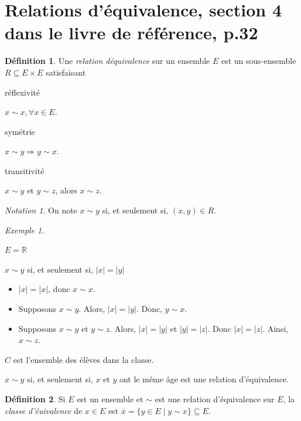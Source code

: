 \documentclass{report}
\newcommand*{\abs}[1]{\left| #1 \right|}
\newcommand*{\reels}{\mathbb{R}}
\theoremstyle{definition}
\newtheorem*{defin}{D\'efinition}
\theoremstyle{remark}
\newtheorem*{exem}{Exemple}
\newtheorem*{nota}{Notation}
\begin{document}
	\section[Relations d'\'equivalence]{Relations d'\'equivalence, section 4 dans le livre de r\'ef\'erence, p.32}
	\begin{defin}
		Une \emph{relation d\'equivalence} sur un ensemble $E$ est un sous-ensemble $R \subseteq E \times E$ satisfaisant
		\begin{nlist}
			\item r\'eflexivit\'e

			$x \sim x, \forall x \in E$.
			\item sym\'etrie

			$x \sim y \Rightarrow y \sim x$.
			\item transitivit\'e

			$x \sim y$ et $y \sim z$, alors $x \sim z$.
		\end{nlist}
		\begin{nota}
			On note $x \sim y$ si, et seulement si, $(x,y) \in R$.
		\end{nota}
	\end{defin}
	\begin{exem}~

		\begin{nlist}
			\item $E = \reels$

			$x \sim y$ si, et seulement si, $\abs{x} = \abs{y}$
			\begin{itemize}
				\item[(refl)] $\abs{x} = \abs{x}$, donc $x \sim x$.
				\item[(sym)] Supposons $x \sim y$. Alors, $\abs{x} = \abs{y}$. Donc, $y \sim x$.
				\item[(trans)] Supposons $x \sim y$ et $y \sim z$. Alors, $\abs{x} = \abs{y}$ et $\abs{y} = \abs{z}$. Donc $\abs{x} = \abs{z}$. Ainsi, $x \sim z$.
			\end{itemize}
			\item $C$ est l'ensemble des \'el\`eves dans la classe.

			$x \sim y$ si, et seulement si, $x$ et $y$ ont le m\^eme \^age est une relation d'\'equivalence.
		\end{nlist}
	\end{exem}
	\begin{defin}
		Si $E$ est un ensemble et $\sim$ est une relation d'\'equivalence sur $E$, la \emph{classe d'\'euivalence} de $x \in E$ est $\overline{x} = \{y \in E \mid y \sim x\} \subseteq E$.
	\end{defin}
\end{document}
